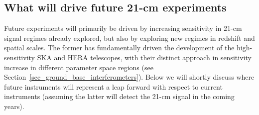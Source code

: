 \subsection{What will drive future 21-cm experiments}

Future experiments will primarily be driven by increasing sensitivity in 21-cm signal regimes already explored, but also by exploring new regimes in redshift and spatial scales. The former has fundamentally driven the development of the high-sensitivity SKA and HERA telescopes, with their distinct approach in sensitivity increase in different parameter space regions (see Section~\ref{sec_ground_base_interferometers}). Below we will shortly discuss where future instruments will represent a leap forward with respect to current instruments (assuming the latter will detect the 21-cm signal in the coming years). 

